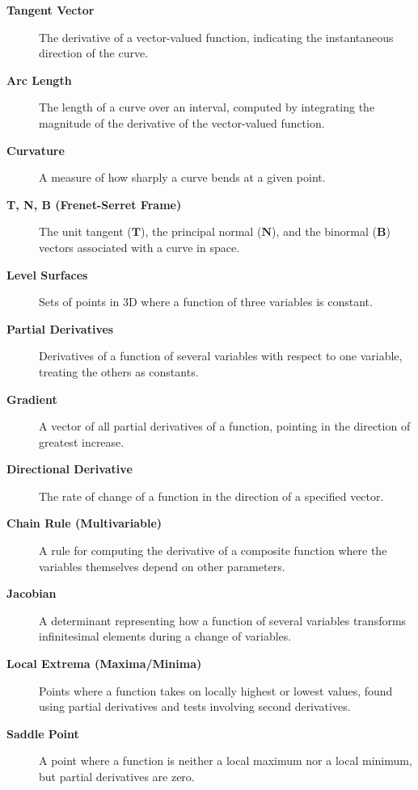 \begin{description}
  \item[\textbf{Tangent Vector}] The derivative of a vector-valued function, indicating the instantaneous direction of the curve.

  \item[\textbf{Arc Length}] The length of a curve over an interval, computed by integrating the magnitude of the derivative of the vector-valued function.

  \item[\textbf{Curvature}] A measure of how sharply a curve bends at a given point.

  \item[\textbf{T, N, B (Frenet-Serret Frame)}] The unit tangent ($\mathbf{T}$), the principal normal ($\mathbf{N}$), and the binormal ($\mathbf{B}$) vectors associated with a curve in space.

  \item[\textbf{Level Surfaces}] Sets of points in 3D where a function of three variables is constant.

  \item[\textbf{Partial Derivatives}] Derivatives of a function of several variables with respect to one variable, treating the others as constants.

  \item[\textbf{Gradient}] A vector of all partial derivatives of a function, pointing in the direction of greatest increase.

  \item[\textbf{Directional Derivative}] The rate of change of a function in the direction of a specified vector.

  \item[\textbf{Chain Rule (Multivariable)}] A rule for computing the derivative of a composite function where the variables themselves depend on other parameters.

  \item[\textbf{Jacobian}] A determinant representing how a function of several variables transforms infinitesimal elements during a change of variables.

  \item[\textbf{Local Extrema (Maxima/Minima)}] Points where a function takes on locally highest or lowest values, found using partial derivatives and tests involving second derivatives.

  \item[\textbf{Saddle Point}] A point where a function is neither a local maximum nor a local minimum, but partial derivatives are zero.


\end{description}
